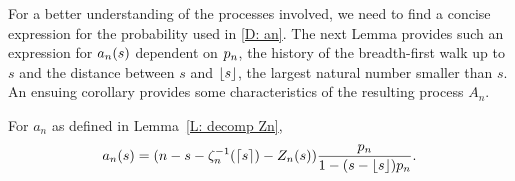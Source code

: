 For a better understanding of the processes involved, we need to find a concise expression for the probability used in \eqref{D: an}.
The next Lemma provides such an expression for $a_n(s)$ 
dependent on $p_n$, the history of the breadth-first walk up to $s$ and the distance between $s$ and $\lfloor s\rfloor$, 
the largest natural number smaller than $s$.
An ensuing corollary provides some characteristics of the resulting process $A_n$.

\begin{lemma} \label{L: formula an}
	For $a_n$ as defined in Lemma~\ref{L: decomp Zn},
	\begin{equation}
	a_n(s) = (n - s - \zeta^{-1}_n(\lceil s\rceil) - Z_n(s)) \frac{p_n}{1-(s-\lfloor s\rfloor)p_n} .
	\end{equation}
\end{lemma}

